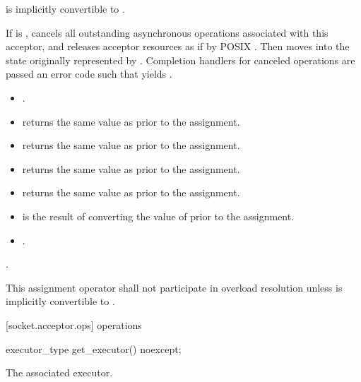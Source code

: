 \begin{itemdescr}
\pnum
\requires {} is implicitly convertible to .

\pnum
\effects If  is , cancels all outstanding asynchronous operations associated with this acceptor, and releases acceptor resources as if by POSIX . Then moves into  the state originally represented by . Completion handlers for canceled operations are passed an error code  such that  yields .

\pnum
\postconditions
\begin{itemize}
\item
{}.
\item
{} returns the same value as  prior to the assignment.
\item
{} returns the same value as  prior to the assignment.
\item
{} returns the same value as  prior to the assignment.
\item
{} returns the same value as  prior to the assignment.
\item
{} is the result of converting the value of  prior to the assignment.
\item
{}.
\end{itemize}

\pnum
\returns {}.

\pnum
\remarks This assignment operator shall not participate in overload resolution unless  is implicitly convertible to .
\end{itemdescr}



[socket.acceptor.ops]{ operations}

\begin{itemdecl}
executor_type get_executor() noexcept;
\end{itemdecl}

\begin{itemdescr}
\pnum
\returns The associated executor.
\end{itemdescr}

